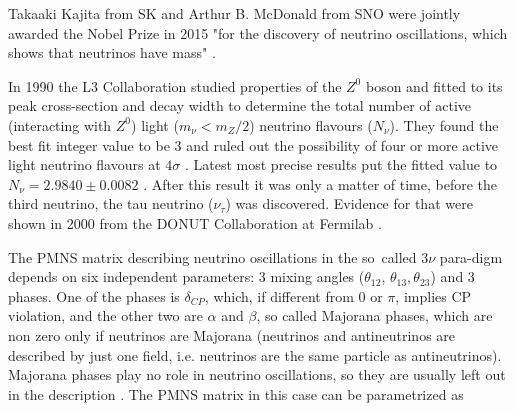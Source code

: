 Takaaki Kajita from SK and Arthur B. McDonald from SNO were jointly awarded the Nobel Prize in 2015 "for the discovery of neutrino oscillations, which shows that neutrinos have mass" \cite{Nobel}.

In 1990 the L3 Collaboration studied properties of the $Z^0$ boson and fitted to its peak cross-section and decay width to determine the total number of active (interacting with $Z^0$) light ($m_{\nu}<m_{Z}/2$) neutrino flavours ($N_{\nu}$). They found the best fit integer value to be 3 and ruled out the possibility of four or more active light neutrino flavours at $4\sigma$ \cite{ZDecay.pdf}. Latest most precise results put the fitted value to $N_{\nu}=2.9840\pm 0.0082$ \cite{ZDecayPrecise.pdf}.
After this result it was only a matter of time, before the third neutrino, the tau neutrino ($\nu_{\tau}$) was discovered. Evidence for that were shown in 2000 from the DONUT Collaboration at Fermilab \cite{ObservationOfTauNeutrino.pdf}.

The PMNS matrix describing neutrino oscillations in the so~called $3\nu$ para-digm depends on six independent parameters: 3 mixing angles ($\theta_{12}$, $\theta_{13}, \theta_{23}$) and 3 phases. One of the phases is $\delta_{CP}$, which, if different from 0 or $\pi$, implies CP violation, and the other two are $\alpha$ and $\beta$, so called Majorana phases, which are non zero only if neutrinos are Majorana (neutrinos and antineutrinos are described by just one field, i.e. neutrinos are the same particle as antineutrinos). Majorana phases play no role in neutrino oscillations, so they are usually left out in the description \cite{PDG.pdf}. The PMNS matrix in this case can be parametrized as

